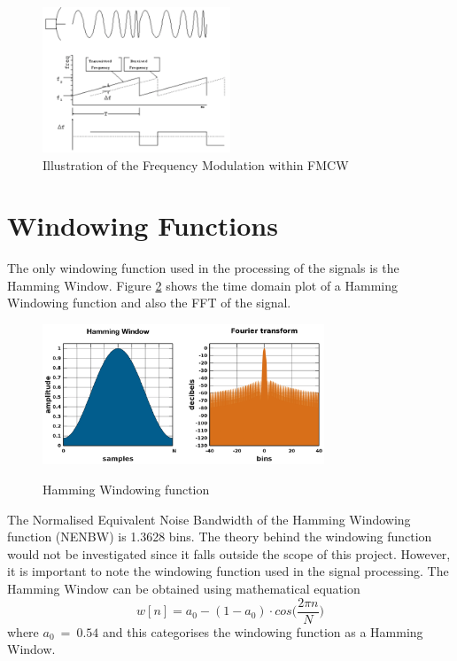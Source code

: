 \begin{figure}[h!]
    \centering
    \includegraphics[width = 0.5\textwidth]{images/FMCW.pdf}
    \caption{Illustration of the Frequency Modulation within FMCW}\label{FMCW}
\end{figure}

\section{Windowing Functions\label{window}}
The only windowing function used in the processing of the signals is the Hamming Window. Figure \ref{hamming} shows the time domain plot of a Hamming Windowing function and also the FFT of the signal.
\begin{figure}[h!]
    \centering
    \includegraphics[width = 0.75\textwidth]{images/hamming.pdf}
    \caption{Hamming Windowing function}\label{hamming}\cite{heinzel_spectrum_2002}
\end{figure}
The Normalised Equivalent Noise Bandwidth of the Hamming Windowing function (NENBW) is 1.3628 bins. The theory behind the windowing function would not be investigated since it falls outside the scope of this project. However, it is important to note the windowing function used in the signal processing. The Hamming Window can be obtained using mathematical equation 
\begin{equation}
w[n] = a_0 - (1 - a_0) \cdot cos\Big(\frac{2\pi n}{N}\Big)
\end{equation}
where $a_0\ =\ 0.54$ and this categorises the windowing function as a Hamming Window.

